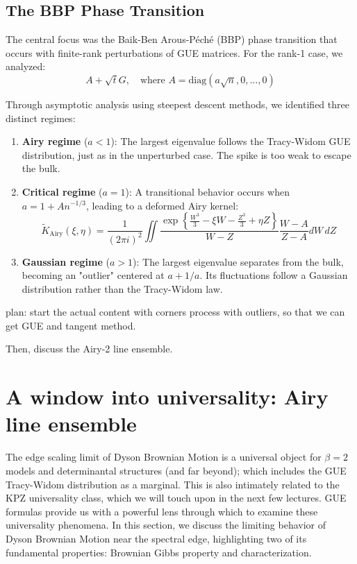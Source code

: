 \documentclass[letterpaper,11pt,oneside,reqno]{article}
\numberwithin{equation}{section}
\theoremstyle{definition}
\begin{document}
\subsection{The BBP Phase Transition}

The central focus was the Baik-Ben Arous-Péché (BBP) phase transition that occurs with finite-rank perturbations of GUE matrices. For the rank-1 case, we analyzed:
\begin{equation}
A + \sqrt{t}G, \quad \text{where } A = \text{diag}(a\sqrt{n},0,\ldots,0)
\end{equation}

Through asymptotic analysis using steepest descent methods, we identified three distinct regimes:

\begin{enumerate}
\item \textbf{Airy regime} ($a < 1$): The largest eigenvalue follows the Tracy-Widom GUE distribution, just as in the unperturbed case. The spike is too weak to escape the bulk.

\item \textbf{Critical regime} ($a = 1$): A transitional behavior occurs when $a = 1 + An^{-1/3}$, leading to a deformed Airy kernel:
\begin{equation}
\tilde{K}_{\text{Airy}}(\xi,\eta) = \frac{1}{(2\pi i)^2}\iint \frac{\exp\left\{\frac{W^3}{3}-\xi W-\frac{Z^3}{3}+\eta Z\right\}}{W-Z} \frac{W-A}{Z-A} dW\,dZ
\end{equation}

\item \textbf{Gaussian regime} ($a > 1$): The largest eigenvalue separates from the bulk, becoming an "outlier" centered at $a + 1/a$. Its fluctuations follow a Gaussian distribution rather than the Tracy-Widom law.
\end{enumerate}


plan: start the actual content with corners process with outliers, so that we can get GUE and tangent method.

Then, discuss the Airy-2 line ensemble.




\section{A window into universality: Airy line ensemble}

The edge scaling limit of Dyson Brownian Motion is a universal object for $\beta=2$ models and determinantal structures (and far beyond); which includes the GUE Tracy-Widom distribution as a marginal. This is also intimately related to the KPZ universality class, which we will touch upon in the next few lectures.
GUE formulas
provide us with a powerful lens through which to examine these universality phenomena. In this section, we discuss the limiting behavior of Dyson Brownian Motion near the spectral edge, highlighting two of its fundamental properties: Brownian Gibbs property and characterization.
\end{document}
